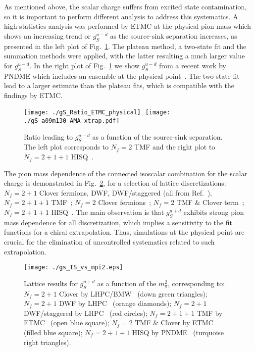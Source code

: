 \documentclass[epj]{webofc}
\newcommand{\cl}{\centerline}
\begin{document}
%
As mentioned above, the scalar charge suffers from excited state contamination, so it is important to perform different
analysis to address this systematics. A high-statistics analysis was performed by ETMC at the physical pion mass
\cite{Abdel-Rehim:2015owa} which shows an increasing trend or $g^{u-d}_S$ as the source-sink separation increases, as presented in
the left plot of Fig.~\ref{fig_gS_ratio}. The plateau method, a two-state fit and the summation methods were applied, with the latter
resulting a much larger value for $g^{u-d}_S$. In the right plot of Fig.~\ref{fig_gS_ratio} we show $g^{u-d}_S$ from a recent work by PNDME
which includes an ensemble at the physical point~\cite{Bhattacharya:2016zcn}. The two-state fit lead to a larger estimate than
the plateau fits, which is compatible with the findings by ETMC.
\begin{figure}[!h]
\cl{\texttt{[image: ./gS\_Ratio\_ETMC\_physical]}\,\, 
\texttt{[image: ./gS\_a09m130\_AMA\_xtrap.pdf]}}
\caption{Ratio leading to $g^{u-d}_S$ as a function of the source-sink separation. The left plot corresponds to $N_f{=}2 $ TMF
\cite{Abdel-Rehim:2015owa} and the right plot to $N_f{=}2{+}1{+}1$ HISQ~\cite{Bhattacharya:2016zcn}. }
\label{fig_gS_ratio}
\end{figure}
\FloatBarrier
The pion mass dependence of the connected isoscalar combination for the scalar charge is demonstrated in Fig.~\ref{fig_gS_IS},
for a selection of lattice discretizations: $N_f{=}2{+}1$ Clover fermions, DWF, DWF/staggered (all from Ref.~\cite{Green:2012ej}), 
$N_f{=}2{+}1{+}1$ TMF~\cite{Alexandrou:2013jsa};
$N_f{=}2$ Clover fermions~\cite{Bali:2014nma};
$N_f{=}2$ TMF $\&$ Clover term~\cite{Abdel-Rehim:2015owa};
$N_f{=}2{+}1{+}1$ HISQ~\cite{Bhattacharya:2013ehc}.
The main observation is that $g^{u+d}_S$ exhibits strong pion mass dependence for all discretization, which implies a sensitivity to 
the fit functions for a chiral extrapolation. Thus, simulations at the physical point are crucial for the elimination of uncontrolled 
systematics related to such extrapolation.
\begin{figure}[!h]
\cl{\texttt{[image: ./gs\_IS\_vs\_mpi2.eps]}}
\caption{Lattice results for $g^{u+d}_S$ as a function of the $m_\pi^2$, corresponding to: 
$N_f{=}2{+}1$ Clover by LHPC/BMW~\cite{Green:2012ej} (down green triangles);
$N_f{=}2{+}1$ DWF by LHPC~\cite{Green:2012ej} (orange diamonds);
$N_f{=}2{+}1$  DWF/staggered by LHPC~\cite{Green:2012ej} (red circles);
$N_f{=}2{+}1{+}1$ TMF by ETMC~\cite{Alexandrou:2013jsa} (open blue square);
$N_f{=}2$ TMF $\&$ Clover by ETMC~\cite{Abdel-Rehim:2015owa} (filled blue square);
$N_f{=}2{+}1{+}1$ HISQ by PNDME~\cite{Bhattacharya:2013ehc} (turquoise right triangles).} 
\label{fig_gS_IS}
\end{figure}
\FloatBarrier
\end{document}
